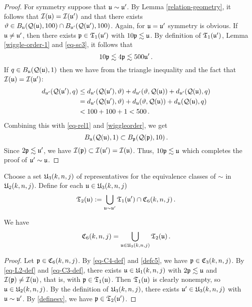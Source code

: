 {\begin{proof}
    For symmetry suppose that ${\mathfrak u} \sim {\mathfrak u}'$. By Lemma \eqref{relation-geometry}, it follows that ${\mathcal{I}}({\mathfrak u}) = {\mathcal{I}}({\mathfrak u}')$ and that there exists ${\vartheta} \in B_{{\mathfrak u}}({\mathcal{Q}}({\mathfrak u}), 100) \cap B_{{\mathfrak u}'}({\mathcal{Q}}({\mathfrak u}'), 100)$. Again, for ${\mathfrak u} = {\mathfrak u}'$ symmetry is obvious. If ${\mathfrak u} \ne {\mathfrak u}'$, then there exists ${\mathfrak p} \in \mathfrak{T}_1({\mathfrak u}')$ with $10{\mathfrak p}\lesssim {\mathfrak u}$. By definition of $\mathfrak{T}_1({\mathfrak u}')$, Lemma \ref{wiggle-order-1} and \eqref{eq-sc3}, it follows that
    \begin{equation}
        \label{eq-rel1}
        10{\mathfrak p} \lesssim 4{\mathfrak p} \lesssim 500 {\mathfrak u}'\,.
    \end{equation}
    If $q \in B_{{\mathfrak u}}({\mathcal{Q}}({\mathfrak u}),1)$ then we have from the triangle inequality and the fact that ${\mathcal{I}}({\mathfrak u}) = {\mathcal{I}}({\mathfrak u}')$:
    \begin{align*}
        d_{{\mathfrak u}'}({\mathcal{Q}}({\mathfrak u}'), q) &\le d_{{\mathfrak u}'}({\mathcal{Q}}({\mathfrak u}'), {\vartheta}) + d_{{\mathfrak u}'}({\vartheta}, {\mathcal{Q}}({\mathfrak u})) + d_{{\mathfrak u}'}({\mathcal{Q}}({\mathfrak u}), q)\\
        &= d_{{\mathfrak u}'}({\mathcal{Q}}({\mathfrak u}'), {\vartheta}) + d_{{\mathfrak u}}({\vartheta}, {\mathcal{Q}}({\mathfrak u})) + d_{{\mathfrak u}}({\mathcal{Q}}({\mathfrak u}), q)\\
        &< 100 + 100 + 1 < 500\,.
    \end{align*}
    Combining this with \eqref{eq-rel1} and \eqref{wiggleorder}, we get
    \begin{equation*}
     B_{{\mathfrak u}}({\mathcal{Q}}({\mathfrak u}), 1) \subset B_{{\mathfrak p}}({\mathcal{Q}}({\mathfrak p}), 10)\, .
    \end{equation*}
    Since $2{\mathfrak p} \lesssim {\mathfrak u}'$, we have ${\mathcal{I}}({\mathfrak p}) \subset {\mathcal{I}}({\mathfrak u}') = {\mathcal{I}}({\mathfrak u})$. Thus, $10{\mathfrak p} \lesssim {\mathfrak u}$ which completes the proof of ${\mathfrak u}' \sim {\mathfrak u}$.
\end{proof}

Choose a set  ${\mathfrak U}_3(k,n,j)$ of representatives for the equivalence
classes of $\sim$ in ${\mathfrak U}_2(k,n,j)$.
Define for each ${\mathfrak u}\in {\mathfrak U}_3(k,n,j)$
\begin{equation}\label{definesv}
{\mathfrak T}_2({\mathfrak u}):=
   \bigcup_{{\mathfrak u}\sim {\mathfrak u}'}\mathfrak{T}_1({\mathfrak u}')\cap {\mathfrak C}_6(k,n,j)\, .
\end{equation}

\begin{lemma}[C6 forest]
\label{C6-forest}
We have
\begin{equation}
    {\mathfrak C}_6(k,n,j)=\bigcup_{{\mathfrak u}\in {\mathfrak U}_3(k,n,j)}\mathfrak{T}_2({\mathfrak u})\, .
\end{equation}
\end{lemma}
\begin{proof}
    Let ${\mathfrak p} \in {\mathfrak C}_6(k,n,j)$.
    By \eqref{eq-C4-def} and \eqref{defc5}, we have ${\mathfrak p} \in {\mathfrak C}_3(k,n,j)$. By \eqref{eq-L2-def} and \eqref{eq-C3-def}, there exists ${\mathfrak u} \in {\mathfrak U}_1(k,n,j)$ with $2{\mathfrak p} \lesssim {\mathfrak u}$ and ${\mathcal{I}}({\mathfrak p}) \ne {\mathcal{I}}({\mathfrak u})$, that is, with ${\mathfrak p} \in \mathfrak{T}_1({\mathfrak u})$. Then $\mathfrak{T}_1({\mathfrak u})$ is clearly nonempty, so ${\mathfrak u} \in {\mathfrak U}_2(k,n,j)$. By the definition of ${\mathfrak U}_3(k,n,j)$, there exists ${\mathfrak u}' \in {\mathfrak U}_3(k,n,j)$ with ${\mathfrak u} \sim {\mathfrak u}'$. By \eqref{definesv}, we have ${\mathfrak p} \in \mathfrak{T}_2({\mathfrak u}')$.
\end{proof}

}
